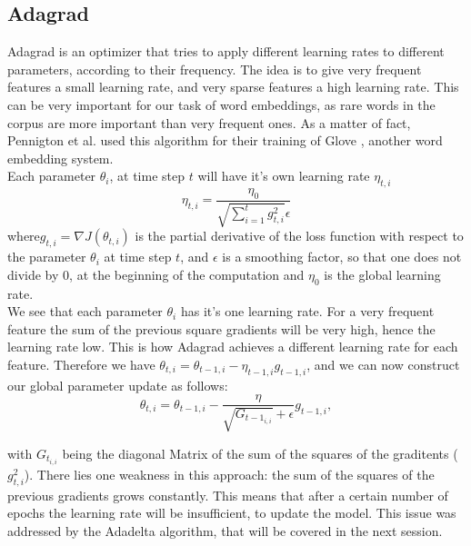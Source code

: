 \subsection{Adagrad}\label{ssec:adagrad}
Adagrad \cite{adagrad} is an optimizer that tries to apply different learning rates to different parameters, according to their frequency. The idea is to give very frequent features a small learning rate, and very sparse features a high learning rate. This can be very important for our task of word embeddings, as rare words in the corpus are more important than very frequent ones. As a matter of fact, Pennigton et al. used this algorithm for their training of Glove  \cite{glove}, another word embedding system. \\
Each parameter $\theta_i$, at time step $t$ will have it's own learning rate $\eta_{t,i}$
 \begin{equation}
\eta_{t,i} = \frac{\eta_0}{\sqrt{\sum^{t}_{i=1} g^{2}_{t,i}} \epsilon}
\end{equation}
where$g_{t,i} = \nabla J(\theta_{t,i})$  is the partial derivative of the loss function with respect to the parameter $\theta_i$ at time step $t$, and $\epsilon$ is a smoothing factor, so that one does not divide by $0$, at the beginning of the computation and $\eta_0$ is the global learning rate.\\ We see that each parameter $\theta_{i}$ has it's one learning rate. For a very frequent feature the sum of the previous square gradients will be very high, hence the learning rate low. This is how Adagrad achieves a different learning rate for each feature. 
Therefore we have $ \theta_{t,i} = \theta_{t-1,i} - \eta_{t-1,i} g_{t-1,i} $, and we can now construct our global parameter update as follows: 
\begin{equation}
\theta_{t,i} = \theta_{t-1,i}- \frac{\eta}{\sqrt{G_{{t-1}_{i,i}}} + \epsilon} g_{t-1,i}, 
\end{equation} 

with  $G_{t_{i,i}}$ being the diagonal Matrix of the sum of the squares of the graditents ($g_{t,i}^2 $). 
There lies one weakness in this approach: the sum of the squares of the previous gradients grows constantly. This means that after a certain number of epochs the learning rate will be insufficient, to update the model. This issue was addressed by the Adadelta algorithm, that will be covered in the next session. 

